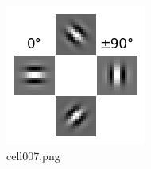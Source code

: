 \begin{figure}[ht]
	\centering
	\includegraphics[scale=0.8, max width=\linewidth]{./fig/bayesian-brain/neural-sampling/cell007.png}
	\caption{cell007.png}
	\label{cell007.png}
\end{figure}